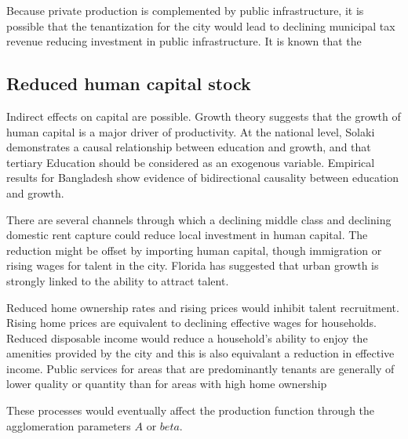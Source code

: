Because private production is complemented by public infrastructure, it is possible that the tenantization for the city would lead to declining municipal tax revenue reducing investment in public infrastructure. It is  known that the  


\subsection{Reduced human capital stock}
Indirect effects on capital are possible. Growth theory suggests that the growth of human capital is  a major driver of productivity.  At the national level, Solaki \cite{solakiRelationshipEducationGDP2013} demonstrates a causal relationship between education and growth, and that tertiary Education should be considered as an exogenous variable.  Empirical results for Bangladesh \cite{islam2007relationship}show evidence of bidirectional causality between education and growth.   

There are several channels through which a declining middle class and declining domestic rent capture could reduce local investment in human capital. The reduction might be offset by importing human capital, though immigration or rising wages for talent in the city. Florida\cite{floridaCompetingAgeTalent2005, floridaCreativeClassEconomic2014} has suggested that urban growth is strongly linked to the ability to attract talent. 

Reduced home ownership rates and rising prices would inhibit talent recruitment.  Rising home prices are equivalent to declining effective wages for households. Reduced disposable income would reduce a household's ability to enjoy the amenities provided by the city and this is also equivalant a reduction in effective income. Public services for areas that are predominantly tenants are generally of lower quality or quantity than for areas with high home ownership




These processes would eventually affect the production function through the agglomeration parameters $A$ or $beta$.




